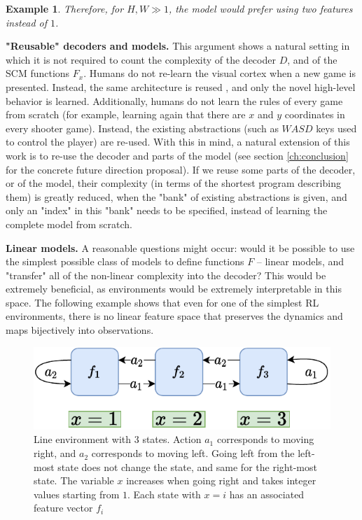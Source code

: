 \documentclass[a4paper,11pt,oneside]{report}
\newtheorem{example}{Example}[section]
\begin{document}
\begin{example}
    Therefore, for $H,W\gg 1$, the model would prefer using two features instead of $1$.

\end{example}

{\bf "Reusable" decoders and models.} This argument shows a natural setting in which it is not required to count the complexity of the decoder $D$, and of the SCM functions $F_x$. Humans do not re-learn the visual cortex when a new game is presented. Instead, the same architecture is reused \cite{Bengio2012,Veerapaneni2019,Ibrahim2020,Didolkar2021,Gomez2006,Mao2019}, and only the novel high-level behavior is learned. Additionally, humans do not learn the rules of every game from scratch (for example, learning again that there are $x$ and $y$ coordinates in every shooter game). Instead, the existing abstractions (such as $WASD$ keys used to control the player) are re-used. With this in mind, a natural extension of this work is to re-use the decoder and parts of the model (see section \ref{ch:conclusion} for the concrete future direction proposal). If we reuse some parts of the decoder, or of the model, their complexity (in terms of the shortest program describing them) is greatly reduced, when the "bank" of existing abstractions is given, and only an "index" in this "bank" needs to be specified, instead of learning the complete model from scratch.


{\bf Linear models.} A reasonable questions might occur: would it be possible to use the simplest possible class of models to define functions $F$ -- linear models, and "transfer" all of the non-linear complexity into the decoder? This would be extremely beneficial, as environments would be extremely interpretable in this space. The following example shows that even for one of the simplest RL environments, there is no linear feature space that preserves the dynamics and maps bijectively into observations.

\begin{figure}
    \centering
    \includegraphics[width=0.7\linewidth]{diagrams/env_line_3}
    \caption{Line environment with 3 states. Action $a_1$ corresponds to moving right, and $a_2$ corresponds to moving left. Going left from the left-most state does not change the state, and same for the right-most state. The variable $x$ increases when going right and takes integer values starting from $1$. Each state with $x=i$ has an associated feature vector $f_i$}
    \label{fig:env_line3}
\end{figure}
\end{document}

